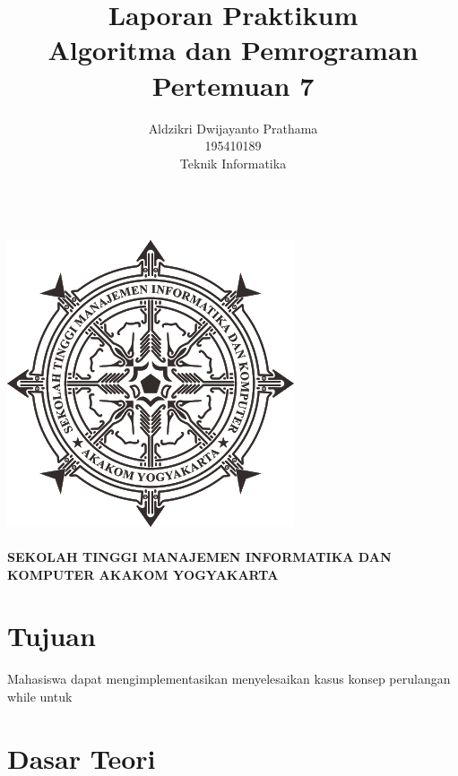 \documentclass[a4paper,12pt]{article}
\begin{document}
\title{ {\Large Laporan Praktikum}\\ Algoritma dan Pemrograman \\{\Large Pertemuan 7}}

\author{Aldzikri Dwijayanto Prathama 
	\\195410189
	\\Teknik Informatika}
\makeatletter
\begin{titlepage}
	\begin{center}
		{\huge \bfseries \@title }\\[14ex]
		\includegraphics[scale=.8]{logo}\\[4ex]
		{\large \@author}\\[19ex]
		{\large \bfseries {SEKOLAH TINGGI MANAJEMEN INFORMATIKA DAN KOMPUTER
				AKAKOM YOGYAKARTA}}
	\end{center}


\end{titlepage}
\makeatother
\newpage
\tableofcontents
\newpage

\section{Tujuan}
Mahasiswa dapat mengimplementasikan menyelesaikan kasus konsep perulangan while untuk
\section{Dasar Teori}
\end{document}
